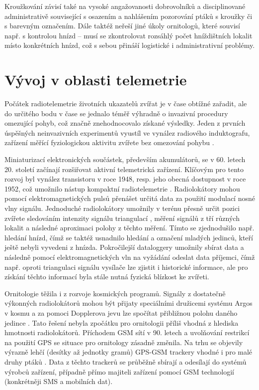 Kroužkování závisí také na vysoké angažovanosti dobrovolníků a disciplinované administrativě související s osazením a nahlášením pozorování ptáků s kroužky či s barevným označením. Dále taktéž neřeší jiné úkoly ornitologů, které souvisí např. s kontrolou hnízd -- musí se zkontrolovat rozsáhlý počet hníždištních lokalit místo konkrétních hnízd, což s sebou přináší logistické i administrativní problémy.

\section{Vývoj v oblasti telemetrie}

Počátek radiotelemetrie životních ukazatelů zvířat je v čase obtížné zařadit, ale do určitého bodu v čase se jednalo téměř výhradně o invazivní procedury omezující pohyb, což značně znehodnocovalo získané výsledky. Jeden z prvních úspěšných neinvazivních experimentů vyustíl ve vynález radiového induktografu, zařízení měřící fyziologickou aktivitu zvířete bez omezování pohybu \cite{fuller1948radio}.

Miniaturizací elektronických součástek, především akumulátorů, se v 60. letech 20. století začínají rozšiřovat aktivní telemetrická zařízení. Klíčovým pro tento rozvoj byl vynález transistoru v roce 1948, resp. jeho obecná dostupnost v roce 1952, což umožnilo nástup kompaktní radiotelemetrie \cite{amlaner2013handbook}. Radiolokátory mohou pomocí elektromagnetických pulsů přenášet určitá data za použití modulací nosné vlny signálu. Jednoduché radiolokátory umožnily v terénu přesně určit pozici zvířete sledováním intenzity signálu triangulací \cite{Farve2014}, měření signálů z tří různých lokalit a následné aproximaci polohy z těchto měření. Tímto se zjednodušilo např. hledání hnízd, čímž se taktéž usnadnilo hledání a označení mladých jedinců, kteří ještě nebyli vyvedeni z hnízda. Pokročilejší dataloggery umožnily sbírat data a následně pomocí elektromagnetických vln na vyžádání odeslat data příjemci, čímž např. oproti triangulaci signálu vysílače lze zjistit i historické informace, ale pro získání těchto informací byla stále nutná fyzická blízkost ke zvířeti.


Ornitologie těžila i z rozvoje kosmických programů. Signály z dostatečně výkonných radiolokátorů mohou být přijaty speciálními družicemi systému Argos v kosmu a za pomoci Dopplerova jevu lze spočítat přibližnou polohu daného jedince \cite{Farve2014}. Tato řešení nebyla zpočátku pro ornitologii příliš vhodná z hlediska hmotnosti radiolokátorů. Příchodem GSM sítí v 90. letech a uvolňování restrikcí na použití GPS se situace pro ornitology zásadně změnila. Na trhu se objevily výrazně lehčí (desítky až jednotky gramů) GPS-GSM trackery vhodné i pro malé druhy ptáků \cite{sokolov2011modern}. Data z těchto trackerů se průběžně sbírají a odesílají do systémů výrobců zařízení, případně přímo majiteli zařízení pomocí GSM technologií (konkrétněji SMS a mobilních dat).

